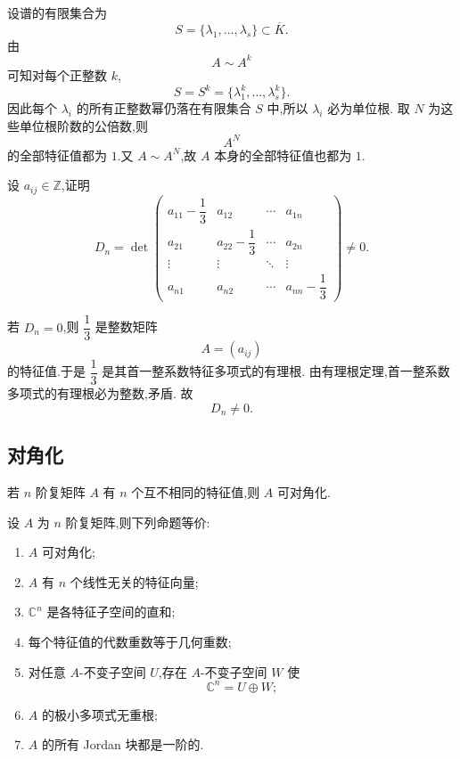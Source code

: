 \begin{solution}
设谱的有限集合为
\[
S=\{\lambda_1,\ldots,\lambda_s\}\subset\overline K.
\]
由
\[
A\sim A^k
\]
可知对每个正整数 $k$,
\[
S=S^k=\{\lambda_1^k,\ldots,\lambda_s^k\}.
\]
因此每个 $\lambda_i$ 的所有正整数幂仍落在有限集合 $S$ 中,所以 $\lambda_i$ 必为单位根.
取 $N$ 为这些单位根阶数的公倍数,则
\[
A^N
\]
的全部特征值都为 $1$.又 $A\sim A^N$,故 $A$ 本身的全部特征值也都为 $1$.
\end{solution}


\begin{example}
设 $a_{ij}\in\mathbb{Z}$,证明
\[
D_n=
\det
\begin{pmatrix}
a_{11}-\dfrac13&a_{12}&\cdots&a_{1n}\\
a_{21}&a_{22}-\dfrac13&\cdots&a_{2n}\\
\vdots&\vdots&\ddots&\vdots\\
a_{n1}&a_{n2}&\cdots&a_{nn}-\dfrac13
\end{pmatrix}
\neq0.
\]
\end{example}
\exampleblank

\begin{solution}
若 $D_n=0$,则 $\dfrac13$ 是整数矩阵
\[
A=(a_{ij})
\]
的特征值.于是 $\dfrac13$ 是其首一整系数特征多项式的有理根.
由有理根定理,首一整系数多项式的有理根必为整数,矛盾.
故
\[
\boxed{D_n\neq0}.
\]
\end{solution}


\subsection{对角化}

\begin{theorem}[\markstar]
若 $n$ 阶复矩阵 $A$ 有 $n$ 个互不相同的特征值,则 $A$ 可对角化.
\end{theorem}


\begin{proposition}[\marktwostar]
设 $A$ 为 $n$ 阶复矩阵,则下列命题等价:
\begin{enumerate}
    \item $A$ 可对角化;
    \item $A$ 有 $n$ 个线性无关的特征向量;
    \item $\mathbb{C}^n$ 是各特征子空间的直和;
    \item 每个特征值的代数重数等于几何重数;
    \item 对任意 $A$-不变子空间 $U$,存在 $A$-不变子空间 $W$ 使
    \[
    \mathbb{C}^n=U\oplus W;
    \]
    \item $A$ 的极小多项式无重根;
    \item $A$ 的所有 Jordan 块都是一阶的.
\end{enumerate}
\end{proposition}


